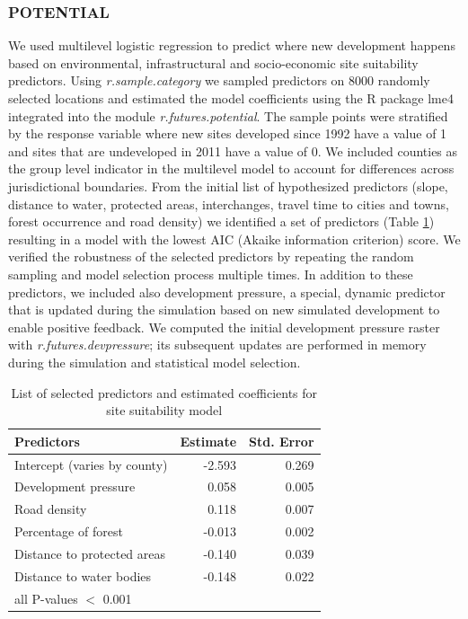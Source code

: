 \documentclass{isprs}
\begin{document}
\subsubsection{POTENTIAL}
We used multilevel logistic regression to predict
where new development happens based on
environmental, infrastructural and socio-economic site suitability
predictors. 
Using \emph{r.sample.category} we sampled predictors on 8000 
randomly selected locations and estimated the model coefficients
using the R package lme4 integrated into the module \emph{r.futures.potential}.
The sample points were stratified by the response variable
where new sites developed since 1992 have a value of 1
and sites that are undeveloped in 2011 have a value of 0.
We included counties as the group level indicator
in the multilevel model to account for differences
across jurisdictional boundaries.
From the initial list of hypothesized predictors
(slope, distance to water, protected areas, interchanges,
travel time to cities and towns, forest occurrence and road density)
we identified a set of predictors (Table \ref{tab:predictors})
resulting in a model with the lowest AIC (Akaike information criterion) score.
We verified the robustness of the selected predictors
by repeating the random sampling and model selection process multiple times.
In addition to these predictors, we included also development pressure,
 a special, dynamic predictor that is
 updated during the simulation based on new simulated development to enable positive feedback.
We computed the initial development pressure raster
with \emph{r.futures.devpressure}; its subsequent updates are performed in memory during the simulation
and statistical model selection.

\begin{table}[htb]
 \centering
\begin{center}
\begin{tabular}{lrr}
\toprule
Predictors & Estimate{\scriptsize *} & Std. Error \\ \midrule
Intercept (varies by county) & -2.593 & 0.269\\
Development pressure & 0.058 & 0.005\\
Road density & 0.118 & 0.007\\
Percentage of forest & -0.013 & 0.002 \\
Distance to protected areas & -0.140 & 0.039\\
Distance to water bodies & -0.148 & 0.022\\
\bottomrule
{\scriptsize * all P-values $<$ 0.001}
\end{tabular}
\end{center}
 \caption{List of selected predictors and estimated coefficients
 for site suitability model}
 \label{tab:predictors}
\end{table}
\end{document}
